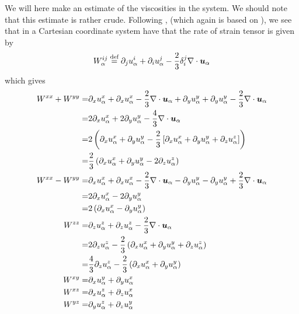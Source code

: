We will here make an estimate of the viscosities in the system.
We should note that this estimate is rather crude.
Following \cite{Helander2002book}, (which again is based on \cite{Braginskii1965}), we see that in a Cartesian coordinate system have that the rate of strain tensor is given by
%
\begin{align*}
    W^{ij}_{\alpha} \overset{\text{def}}{=} \partial_j u^{i}_{\alpha}
                     + \partial_i u^{j}_{\alpha}
                     - \frac{2}{3} \delta_i^j \nabla\cdot \boldsymbol{u}_{\alpha}
\end{align*}
%
which gives
\begin{align*}
W^{xx} + W^{yy}
=&
\partial_x u^{x}_{\a}
+ \partial_x u^{x}_{\a}
- \frac{2}{3} \div \ve{u}_{\a}
+ \partial_y u^{y}_{\a}
+ \partial_y u^{y}_{\a}
- \frac{2}{3} \div \ve{u}_{\a}
\\
=&
2\partial_x u^{x}_{\a}
+ 2\partial_y u^{y}_{\a}
- \frac{4}{3} \div \ve{u}_{\a}
\\
=&
2\L(\partial_x u^{x}_{\a}
    + \partial_y u^{y}_{\a}
    - \frac{2}{3} \L[\partial_x u^{x}_{\a}
          +\partial_y u^{y}_{\a}
          +\partial_z u^{z}_{\a}
                      \R] \R)
\\
=&
\frac{2}{3}\L(\partial_x u^{x}_{\a}
          + \partial_y u^{y}_{\a}
          - 2\partial_z u^{z}_{\a} \R)
\\
%
%
%
W^{xx} - W^{yy}
=&
\partial_x u^{x}_{\a}
+ \partial_x u^{x}_{\a}
- \frac{2}{3} \div \ve{u}_{\a}
- \partial_y u^{y}_{\a}
- \partial_y u^{y}_{\a}
+ \frac{2}{3} \div \ve{u}_{\a}
\\
=&
2\partial_x u^{x}_{\a} -2 \partial_y u^{y}_{\a}
\\
=&
2\L(\partial_x u^{x}_{\a} - \partial_y u^{y}_{\a} \R)
\\
%
%
%
W^{zz}
=&
\partial_z u^{z}_{\a} + \partial_z u^{z}_{\a} - \frac{2}{3} \div \ve{u}_{\a}
\\
%
=&
2\partial_z u^{z}_{\a} - \frac{2}{3}
    \L(\partial_x u^{x}_{\a}
       +\partial_y u^{y}_{\a}
       +\partial_z u^{z}_{\a}
    \R)
\\
%
=&
\frac{4}{3} \partial_z u^{z}_{\a} - \frac{2}{3}
    \L(\partial_x u^{x}_{\a}
       +\partial_y u^{y}_{\a}
    \R)
\\
%
%
%
%
W^{xy}
=&
\partial_x u^{y}_{\a} + \partial_y u^{x}_{\a}
\\
%
%
%
%
W^{xz}
=&
\partial_x u^{z}_{\a} + \partial_z u^{x}_{\a}
\\
%
%
%
W^{yz}
=&
\partial_y u^{z}_{\a} + \partial_z u^{y}_{\a}
%
\end{align*}
